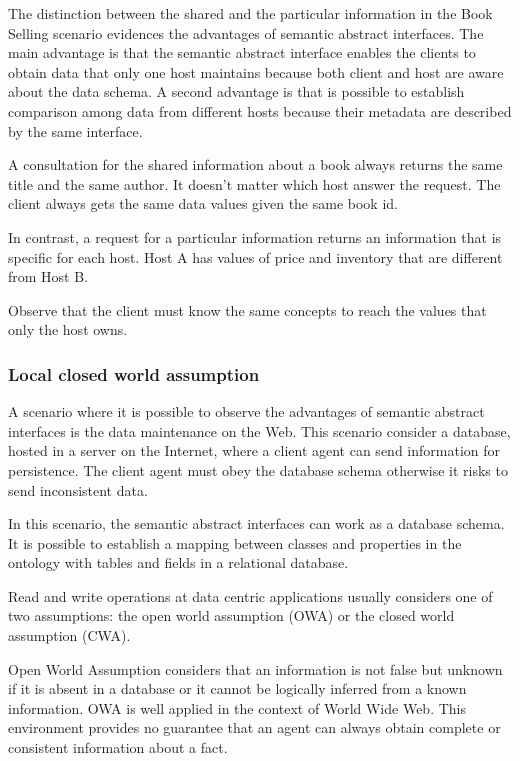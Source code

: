 \documentclass{singlecol-new}
\theoremstyle{TH}{
\newtheorem{lemma}{Lemma}
\newtheorem{theorem}[lemma]{Theorem}
\newtheorem{corrolary}[lemma]{Corrolary}
\newtheorem{conjecture}[lemma]{Conjecture}
\newtheorem{proposition}[lemma]{Proposition}
\newtheorem{claim}[lemma]{Claim}
\newtheorem{stheorem}[lemma]{Wrong Theorem}
\newtheorem{algorithm}{Algorithm}
}
\theoremstyle{THrm}{
\newtheorem{definition}{Definition}[section]
\newtheorem{question}{Question}[section]
\newtheorem{remark}{Remark}
\newtheorem{scheme}{Scheme}
}
\theoremstyle{THhit}{
\newtheorem{case}{Case}[section]
}
\begin{document}
The distinction between the shared and the particular information in the Book Selling scenario evidences the advantages of semantic abstract interfaces.
The main advantage is that the semantic abstract interface enables the clients to obtain data that only one host maintains because both client and host are aware about the data schema. 
A second advantage is that is possible to establish comparison among data from different hosts because their metadata are described by the same interface.

A consultation for the shared information about a book always returns the same title and the same author. It doesn't matter which host answer the request. The client always gets the same data values given the same book id. 

In contrast, a request for a particular information returns an information that is specific for each host. 
Host A has values of price and inventory that are different from Host B. 

Observe that the client must know the same concepts to reach the values that only the host owns. 

\subsubsection{Local closed world assumption}
A scenario where it is possible to observe the advantages of semantic abstract interfaces is the data maintenance on the Web. 
This scenario consider a database, hosted in a server on the Internet, where a client agent can send information for persistence. 
The client agent must obey the database schema otherwise it risks to send inconsistent data. 

In this scenario, the semantic abstract interfaces can work as a database schema. It is possible to establish a mapping between classes and properties in the ontology with tables and fields in a relational database.

Read and write operations at data centric applications usually considers one of two assumptions: the open world assumption (OWA) or the closed world assumption (CWA).

Open World Assumption considers that an information is not false but unknown if it is absent in a database or it cannot be logically inferred from a known information. OWA is well applied in the context of World Wide Web. This environment provides no guarantee that an agent can always obtain complete or consistent information about a fact. 
\end{document}
